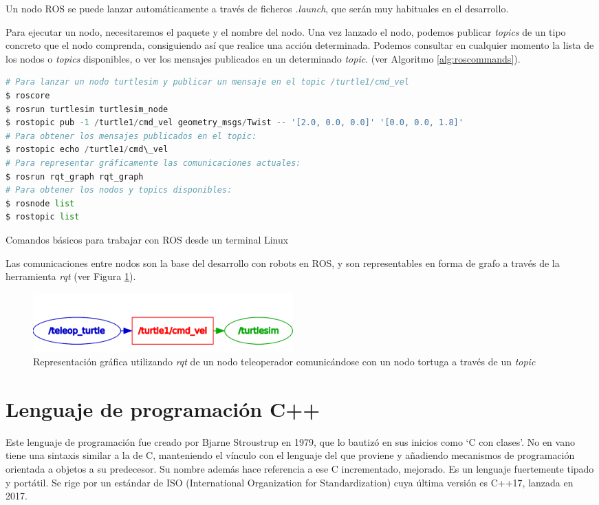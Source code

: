 \documentclass[12pt,spanish,chapterprefix, numbers=noenddot]{book}
\numberwithin{equation}{section}
\numberwithin{figure}{section}
\begin{document}
Un nodo ROS se puede lanzar automáticamente a través de  ficheros \textit{.launch}, que serán muy habituales en el desarrollo. 

Para ejecutar un nodo, necesitaremos el paquete y el nombre del nodo. Una vez lanzado el nodo, podemos publicar \textit{topics} de un tipo concreto que el nodo comprenda, consiguiendo así que realice una acción determinada. Podemos consultar en cualquier momento la lista de los nodos o \textit{topics} disponibles, o ver los mensajes publicados en un determinado \textit{topic}. (ver Algoritmo \ref{alg:roscommands}).

\begin{algorithm}[htb!]
	\begin{lstlisting}[breaklines=true,language=python]
# Para lanzar un nodo turtlesim y publicar un mensaje en el topic /turtle1/cmd_vel
$ roscore
$ rosrun turtlesim turtlesim_node
$ rostopic pub -1 /turtle1/cmd_vel geometry_msgs/Twist -- '[2.0, 0.0, 0.0]' '[0.0, 0.0, 1.8]'
# Para obtener los mensajes publicados en el topic: 
$ rostopic echo /turtle1/cmd\_vel
# Para representar gráficamente las comunicaciones actuales:
$ rosrun rqt_graph rqt_graph
# Para obtener los nodos y topics disponibles: 
$ rosnode list 
$ rostopic list
	\end{lstlisting}
\caption{\label{alg:roscommands}Comandos básicos para trabajar con ROS desde un terminal Linux}
\end{algorithm}

Las comunicaciones entre nodos son la base del desarrollo con robots en ROS, y son representables en forma de grafo a través de la herramienta \textit{rqt} (ver Figura \ref{fig:turtlesim}).

\begin{figure}[hbt!]
\centering
\includegraphics[width=10cm]{Figs/turtle_graph.png}
\par
\caption{\label{fig:turtlesim}Representación gráfica utilizando \textit{rqt} de un nodo teleoperador comunicándose con un nodo tortuga a través de un \textit{topic}}
\end{figure}

\section{Lenguaje de programación C++}
Este lenguaje de programación fue creado por Bjarne Stroustrup en 1979, que lo bautizó en sus inicios como ‘C con clases’. No en vano tiene una sintaxis similar a la de C, manteniendo el vínculo con el lenguaje del que proviene y añadiendo mecanismos de programación orientada a objetos a su predecesor. Su nombre además hace referencia a ese C incrementado, mejorado. 
Es un lenguaje fuertemente tipado y portátil. Se rige por un estándar de ISO (International Organization for Standardization) cuya última versión es C++17, lanzada en 2017. 
\end{document}
